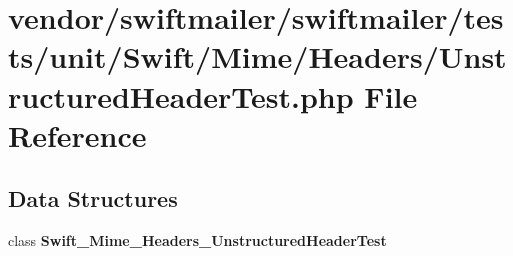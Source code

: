 \section{vendor/swiftmailer/swiftmailer/tests/unit/\+Swift/\+Mime/\+Headers/\+Unstructured\+Header\+Test.php File Reference}
\label{_unstructured_header_test_8php}
\subsection*{Data Structures}
\begin{DoxyCompactItemize}
\item 
class {\bf Swift\+\_\+\+Mime\+\_\+\+Headers\+\_\+\+Unstructured\+Header\+Test}
\end{DoxyCompactItemize}
